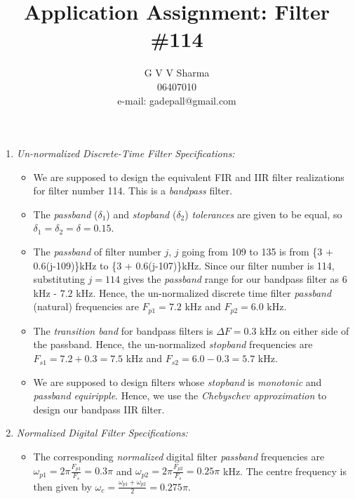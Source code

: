 \documentclass{article}
\begin{document}
\title{ Application Assignment: Filter \#114}

\author{G V V Sharma \\06407010\\ e-mail: gadepall@gmail.com	}

\maketitle

\begin{enumerate}
\item {\em Un-normalized Discrete-Time Filter Specifications:} 
\begin{itemize}
 \item We are supposed to design the equivalent FIR and IIR filter realizations for filter number 114.  
This is a {\em bandpass} filter.
 
 \item The {\em passband} ($\delta_1$) and {\em stopband} ($\delta_2$) {\em tolerances} are given to be equal, so $\delta_1 = \delta_2 = \delta = 0.15$.
 \item The {\em passband} of filter number $j$, $j$ going from 109 to 135 is from \{3 + 0.6(j-109)\}kHz
to \{3 + 0.6(j-107)\}kHz.  Since our filter number is 114, substituting $j = 114$ gives the {\em passband}
range for our bandpass filter as $6$ kHz - $7.2$ kHz.  Hence, the un-normalized discrete time filter
{\em passband} (natural) frequencies are $F_{p1} = 7.2$ kHz
and $F_{p2} = 6.0$ kHz.
\item The {\em transition band} for bandpass filters is $\Delta F = 0.3$ kHz on either side of the passband.
Hence, the un-normalized {\em stopband} frequencies are $F_{s1} = 7.2 + 0.3 = 7.5$ kHz and $F	_{s2} = 6.0 - 0.3 = 5.7$ kHz.
\item We are supposed to design filters whose {\em stopband} is {\em monotonic} and {\em passband equiripple}.  
Hence, we use the {\em Chebyschev approximation} to design our bandpass IIR filter.
 \end{itemize}
 
 \item {\em Normalized Digital Filter Specifications:}
 
 \begin{itemize}
 
 \item The corresponding {\em normalized} digital filter {\em passband} frequencies are
$\omega_{p1} = 2\pi\frac{F_{p1}}{F_s}  = 0.3\pi$  and $\omega_{p2} = 2\pi\frac{F_{p2}}{F_s}  = 0.25 \pi$ kHz.  The centre frequency is then given by  $\omega_c = \frac{\omega_{p1} + \omega_{p2}}{2} = 0.275\pi$.  


\end{itemize}
\end{enumerate}
\end{document}
